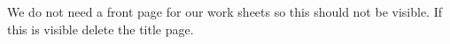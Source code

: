 We do not need a front page for our work sheets so this should not be visible. If this is visible delete the title page.